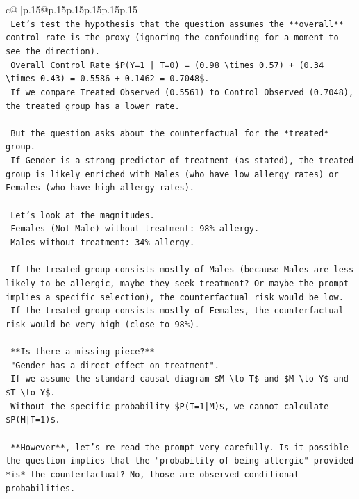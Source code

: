 \documentclass{article}
\begin{document}
{\begin{supertabular}{c@{$\;$}|p{.15\linewidth}@{}p{.15\linewidth}p{.15\linewidth}p{.15\linewidth}p{.15\linewidth}p{.15\linewidth}}
{{{\\ 
\texttt{    Let's test the hypothesis that the question assumes the **overall** control rate is the proxy (ignoring the confounding for a moment to see the direction).} \\
\texttt{    Overall Control Rate \$P(Y=1 | T=0) = (0.98 \textbackslash{}times 0.57) + (0.34 \textbackslash{}times 0.43) = 0.5586 + 0.1462 = 0.7048\$.} \\
\texttt{    If we compare Treated Observed (0.5561) to Control Observed (0.7048), the treated group has a lower rate.} \\
\\ 
\texttt{    But the question asks about the counterfactual for the *treated* group.} \\
\texttt{    If Gender is a strong predictor of treatment (as stated), the treated group is likely enriched with Males (who have low allergy rates) or Females (who have high allergy rates).} \\
\\ 
\texttt{    Let's look at the magnitudes.} \\
\texttt{    Females (Not Male) without treatment: 98\% allergy.} \\
\texttt{    Males without treatment: 34\% allergy.} \\
\\ 
\texttt{    If the treated group consists mostly of Males (because Males are less likely to be allergic, maybe they seek treatment? Or maybe the prompt implies a specific selection), the counterfactual risk would be low.} \\
\texttt{    If the treated group consists mostly of Females, the counterfactual risk would be very high (close to 98\%).} \\
\\ 
\texttt{    **Is there a missing piece?**} \\
\texttt{    "Gender has a direct effect on treatment".} \\
\texttt{    If we assume the standard causal diagram \$M \textbackslash{}to T\$ and \$M \textbackslash{}to Y\$ and \$T \textbackslash{}to Y\$.} \\
\texttt{    Without the specific probability \$P(T=1|M)\$, we cannot calculate \$P(M|T=1)\$.} \\
\\ 
\texttt{    **However**, let's re{-}read the prompt very carefully. Is it possible the question implies that the "probability of being allergic" provided *is* the counterfactual? No, those are observed conditional probabilities.} \\
}}}
\end{supertabular}}
\end{document}
